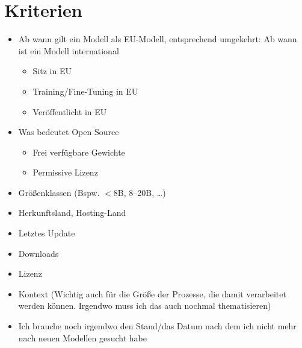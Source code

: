 \section{Kriterien}\label{sec:kriterien}

\begin{itemize}
    \item Ab wann gilt ein Modell als EU-Modell, entsprechend umgekehrt: Ab wann ist ein Modell international
    \begin{itemize}
        \item Sitz in EU
        \item Training/Fine-Tuning in EU
        \item Veröffentlicht in EU
    \end{itemize}
    \item Was bedeutet Open Source
    \begin{itemize}
        \item Frei verfügbare Gewichte
        \item Permissive Lizenz
    \end{itemize}
    \item Größenklassen (Bspw. $<$8B, 8--20B, \ldots)
    \item Herkunftsland, Hosting-Land
    \item Letztes Update
    \item Downloads
    \item Lizenz
    \item Kontext (Wichtig auch für die Größe der Prozesse, die damit verarbeitet werden können. Irgendwo muss ich das auch nochmal thematisieren)
    \item Ich brauche noch irgendwo den Stand/das Datum nach dem ich nicht mehr nach neuen Modellen gesucht habe
\end{itemize}
